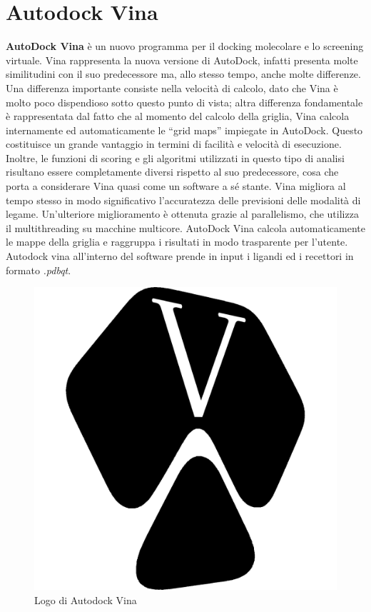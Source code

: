 \section{Autodock Vina}
\textbf{AutoDock Vina} è un nuovo programma per il docking molecolare e lo screening virtuale. Vina rappresenta la nuova versione di AutoDock, infatti presenta molte similitudini con il suo predecessore ma, allo stesso tempo, anche molte differenze. Una differenza importante consiste nella velocità di calcolo, dato che Vina è molto poco dispendioso sotto questo punto di vista; altra differenza fondamentale è rappresentata dal fatto che al momento del calcolo della griglia, Vina calcola internamente ed automaticamente le “grid maps” impiegate in AutoDock. Questo costituisce un grande vantaggio in termini di facilità e velocità di esecuzione. Inoltre, le funzioni di scoring e gli algoritmi utilizzati in questo tipo di analisi risultano essere completamente diversi rispetto al suo predecessore, cosa che porta a considerare Vina quasi come un software a sé stante. Vina migliora al tempo stesso in modo significativo l'accuratezza delle previsioni delle modalità di legame. Un'ulteriore miglioramento è ottenuta grazie al parallelismo, che utilizza il multithreading su macchine multicore. AutoDock Vina calcola automaticamente le mappe della griglia e raggruppa i risultati in modo trasparente per l'utente. Autodock vina all'interno del software prende in input i ligandi ed i recettori in formato \textit{.pdbqt}\cite{huey2012using}.

\begin{figure}[H]
    \centering
    \includegraphics[scale=0.1]{immagini/capitolo2/autoDockVinaLogo.png}
    \caption{Logo di Autodock Vina}
    \label{fig:autodock Vina logo}
\end{figure}

